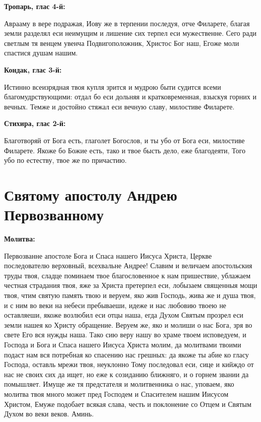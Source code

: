 \bfseries Тропарь, глас 4-й:\normalfont{}


Аврааму в вере подражая, Иову же в терпении последуя, отче Филарете, благая земли разделял еси неимущим и лишение сих терпел еси мужественне. Сего ради светлым тя венцем увенча Подвигоположник, Христос Бог наш, Егоже моли спастися душам нашим.


\medskip
\bfseries Кондак, глас 3-й:\normalfont{}

Истинно всеизрядная твоя купля зрится и мудрою быти судится всеми благомудрствующими: отдал бо еси дольняя и кратковременная, взыскуя горних и вечных. Темже и достойно стяжал еси вечную славу, милостиве Филарете.


\medskip
\bfseries Стихира, глас 2-й:\normalfont{}


Благотворяй от Бога есть, глаголет Богослов, и ты убо от Бога еси, милостиве Филарете. Якоже бо Божие есть, тако и твое бысть дело, еже благодеяти, Того убо по естеству, твое же по причастию.

 



\section{Святому апостолу Андрею Первозванному}
 
\bfseries Молитва:\normalfont{}


Первозванне апостоле Бога и Спаса нашего Иисуса Христа, Церкве последователю верховный, всехвальне Андрее! Славим и величаем апостольския труды твоя, сладце поминаем твое благословенное к нам пришествие, ублажаем честная страдания твоя, яже за Христа претерпел еси, лобызаем священныя мощи твоя, чтим святую память твою и веруем, яко жив Господь, жива же и душа твоя, и с ним во веки на небеси пребываеши, идеже и нас любовию твоею не оставляеши, якоже возлюбил еси отцы наша, егда Духом Святым прозрел еси земли нашея ко Христу обращение. Веруем же, яко и молиши о нас Бога, зря во свете Его вся нужды наша. Тако сию веру нашу во храме твоем исповедуем, и Господа и Бога и Спаса нашего Иисуса Христа молим, да молитвами твоими подаст нам вся потребная ко спасению нас грешных: да якоже ты абие ко гласу Господа, оставль мрежи твоя, неуклонно Тому последовал еси, сице и кийждо от нас не своих сих да ищет, но еже к созиданию ближняго, и о горнем звании да помышляет. Имуще же тя предстателя и молитвенника о нас, уповаем, яко молитва твоя много может пред Господем и Спасителем нашим Иисусом Христом, Емуже подобает всякая слава, честь и поклонение со Отцем и Святым Духом во веки веков. Аминь. 



